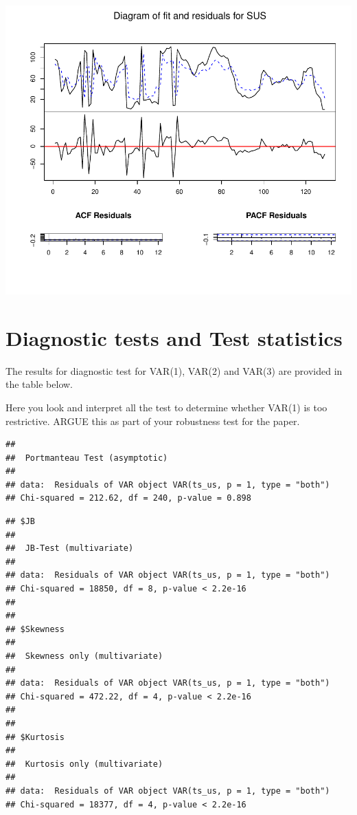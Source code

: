 \documentclass[11pt,preprint, authoryear]{elsarticle}
\numberwithin{equation}{section}
\numberwithin{figure}{section}
\numberwithin{table}{section}
\begin{document}
\includegraphics{replication_files/figure-latex/unnamed-chunk-4-4.pdf}

\hypertarget{diagnostic-tests-and-test-statistics}{%
\section{Diagnostic tests and Test
statistics}\label{diagnostic-tests-and-test-statistics}}

The results for diagnostic test for VAR(1), VAR(2) and VAR(3) are
provided in the table below.

Here you look and interpret all the test to determine whether VAR(1) is
too restrictive. ARGUE this as part of your robustness test for the
paper.

\begin{verbatim}
## 
##  Portmanteau Test (asymptotic)
## 
## data:  Residuals of VAR object VAR(ts_us, p = 1, type = "both")
## Chi-squared = 212.62, df = 240, p-value = 0.898
\end{verbatim}

\begin{verbatim}
## $JB
## 
##  JB-Test (multivariate)
## 
## data:  Residuals of VAR object VAR(ts_us, p = 1, type = "both")
## Chi-squared = 18850, df = 8, p-value < 2.2e-16
## 
## 
## $Skewness
## 
##  Skewness only (multivariate)
## 
## data:  Residuals of VAR object VAR(ts_us, p = 1, type = "both")
## Chi-squared = 472.22, df = 4, p-value < 2.2e-16
## 
## 
## $Kurtosis
## 
##  Kurtosis only (multivariate)
## 
## data:  Residuals of VAR object VAR(ts_us, p = 1, type = "both")
## Chi-squared = 18377, df = 4, p-value < 2.2e-16
\end{verbatim}
\end{document}
